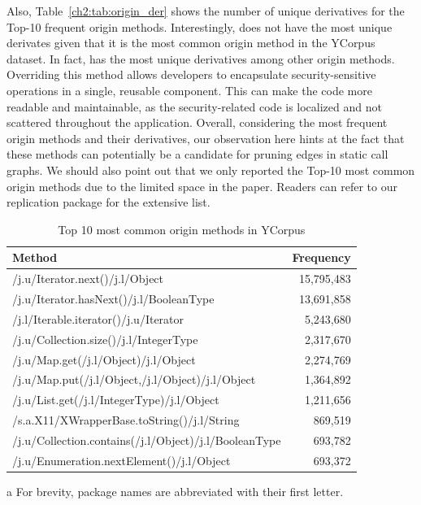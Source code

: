 Also, Table~\ref{ch2:tab:origin_der} shows the number of unique derivatives for the Top-10 frequent origin methods. Interestingly,  does not have the most unique derivates given that it is the most common origin method in the YCorpus dataset. In fact,  has the most unique derivatives among other origin methods. Overriding this method allows developers to encapsulate security-sensitive operations in a single, reusable component. This can make the code more readable and maintainable, as the security-related code is localized and not scattered throughout the application. Overall, considering the most frequent origin methods and their derivatives, our observation here hints at the fact that these methods can potentially be a candidate for pruning edges in static call graphs. We should also point out that we only reported the Top-10 most common origin methods due to the limited space in the paper. Readers can refer to our replication package for the extensive list.

\begin{table}[!t]
\centering
\caption{Top 10 most common origin methods in YCorpus}
\label{ch2:tab:origin_freq}
\begin{threeparttable}
\begin{tabular}{@{}lr@{}}
\toprule
Method\tnote{a} & Frequency \\
\midrule
/j.u/Iterator.next()/j.l/Object & 15,795,483 \\
/j.u/Iterator.hasNext()/j.l/BooleanType & 13,691,858 \\
/j.l/Iterable.iterator()/j.u/Iterator & 5,243,680 \\
/j.u/Collection.size()/j.l/IntegerType & 2,317,670 \\
/j.u/Map.get(/j.l/Object)/j.l/Object & 2,274,769 \\
/j.u/Map.put(/j.l/Object,/j.l/Object)/j.l/Object & 1,364,892 \\
/j.u/List.get(/j.l/IntegerType)/j.l/Object & 1,211,656 \\
/s.a.X11/XWrapperBase.toString()/j.l/String & 869,519 \\
/j.u/Collection.contains(/j.l/Object)/j.l/BooleanType & 693,782 \\
/j.u/Enumeration.nextElement()/j.l/Object & 693,372 \\
\bottomrule
\end{tabular}
\begin{tablenotes}
\item[a] For brevity, package names are abbreviated with their first letter. 
\end{tablenotes}
\end{threeparttable}
\end{table}

